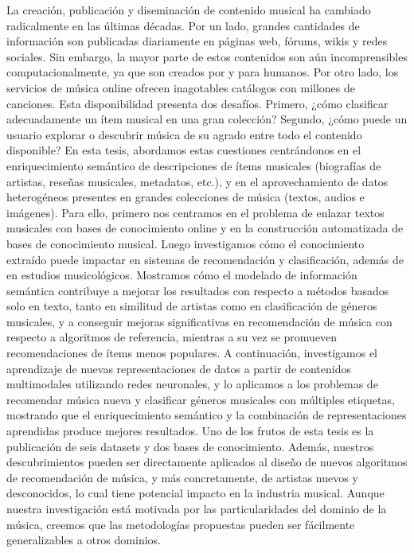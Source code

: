 La creación, publicación y diseminación de contenido musical ha cambiado radicalmente en las últimas décadas. Por un lado, grandes cantidades de información son publicadas diariamente en páginas web, fórums, wikis y redes sociales. Sin embargo, la mayor parte de estos contenidos son aún incomprensibles computacionalmente, ya que son creados por y para humanos. Por otro lado, los servicios de música online ofrecen inagotables catálogos con millones de canciones. Esta disponibilidad presenta dos desafíos. Primero, ¿cómo clasificar adecuadamente un ítem musical en una gran colección? Segundo, ¿cómo puede un usuario explorar o descubrir música de su agrado entre todo el contenido disponible? En esta tesis, abordamos estas cuestiones centrándonos en el enriquecimiento semántico de descripciones de ítems musicales (biografías de artistas, reseñas musicales, metadatos, etc.), y en el aprovechamiento de datos heterogéneos presentes en grandes colecciones de música (textos, audios e imágenes). Para ello, primero nos centramos en el problema de enlazar textos musicales con bases de conocimiento online y en la construcción automatizada de bases de conocimiento musical. Luego investigamos cómo el conocimiento extraído puede impactar en sistemas de recomendación y clasificación, además de en estudios musicológicos. Mostramos cómo el modelado de información semántica contribuye a mejorar los resultados con respecto a métodos basados solo en texto, tanto en similitud de artistas como en clasificación de géneros musicales, y a conseguir mejoras significativas en recomendación de música con respecto a algoritmos de referencia, mientras a su vez se promueven recomendaciones de ítems menos populares. A continuación, investigamos el aprendizaje de nuevas representaciones de datos a partir de contenidos multimodales utilizando redes neuronales, y lo aplicamos a los problemas de recomendar música nueva y clasificar géneros musicales con múltiples etiquetas, mostrando que el enriquecimiento semántico y la combinación de representaciones aprendidas produce mejores resultados. Uno de los frutos de esta tesis es la publicación de seis datasets y dos bases de conocimiento. Además, nuestros descubrimientos pueden ser directamente aplicados al diseño de nuevos algoritmos de recomendación de música, y más concretamente, de artistas nuevos y desconocidos, lo cual tiene potencial impacto en la industria musical. Aunque nuestra investigación está motivada por las particularidades del dominio de la música, creemos que las metodologías propuestas pueden ser fácilmente generalizables a otros dominios.